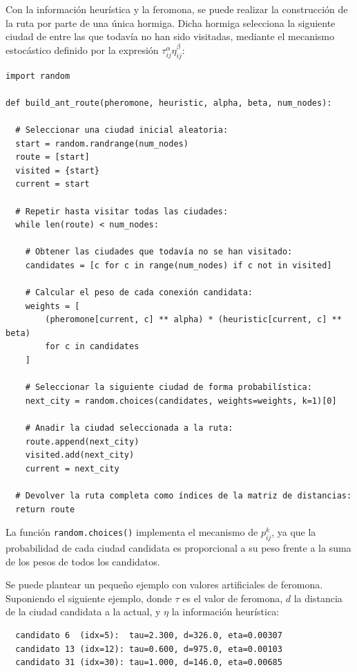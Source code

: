 Con la información heurística y la feromona, se puede realizar la construcción de la ruta por parte de una única hormiga.
Dicha hormiga selecciona la siguiente ciudad de entre las que todavía no han sido visitadas, mediante el mecanismo estocástico
definido por la expresión $\tau_{ij}^{\alpha}\eta_{ij}^{\beta}$:
\newline
\begin{lstlisting}[style=PythonStyle]
import random
 
def build_ant_route(pheromone, heuristic, alpha, beta, num_nodes):
 
  # Seleccionar una ciudad inicial aleatoria:
  start = random.randrange(num_nodes)
  route = [start]
  visited = {start}
  current = start
 
  # Repetir hasta visitar todas las ciudades:
  while len(route) < num_nodes:
 
    # Obtener las ciudades que todavía no se han visitado:
    candidates = [c for c in range(num_nodes) if c not in visited]
 
    # Calcular el peso de cada conexión candidata:
    weights = [
        (pheromone[current, c] ** alpha) * (heuristic[current, c] ** beta)
        for c in candidates
    ]
 
    # Seleccionar la siguiente ciudad de forma probabilística:
    next_city = random.choices(candidates, weights=weights, k=1)[0]
 
    # Anadir la ciudad seleccionada a la ruta:
    route.append(next_city)
    visited.add(next_city)
    current = next_city
 
  # Devolver la ruta completa como índices de la matriz de distancias:
  return route
\end{lstlisting}

La función \texttt{random.choices()} implementa el mecanismo de $p_{ij}^{k}$, ya que la probabilidad de cada ciudad 
candidata es proporcional a su peso frente a la suma de los pesos de todos los candidatos. 

Se puede plantear un pequeño ejemplo con valores artificiales de feromona. Suponiendo el siguiente ejemplo, donde $\tau$
es el valor de feromona, $d$ la distancia de la ciudad candidata a la actual, y $\eta$ la información heurística:
\begin{verbatim}
  candidato 6  (idx=5):  tau=2.300, d=326.0, eta=0.00307
  candidato 13 (idx=12): tau=0.600, d=975.0, eta=0.00103
  candidato 31 (idx=30): tau=1.000, d=146.0, eta=0.00685
\end{verbatim}

